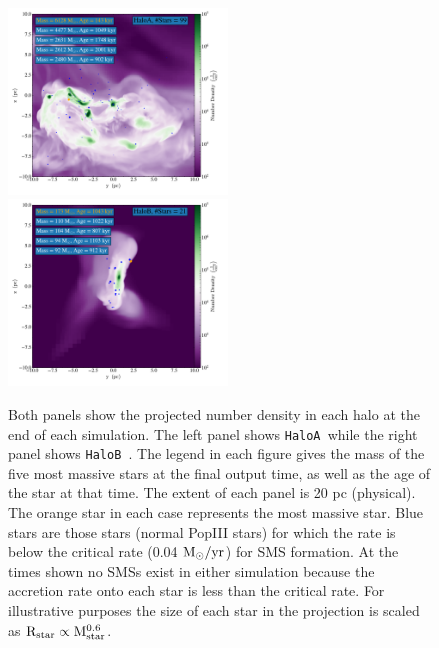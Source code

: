 \documentclass[graphics, twocolumn, usenatbib]{mn2e}
\newcommand{\msolaryrc} {$\rm{M_{\odot}/yr}$}
\newcommand{\ha} {\texttt{HaloA~}}
\newcommand{\hb} {\texttt{HaloB~}}
\begin{document}
\begin{figure}
\centering
\begin{minipage}{175mm}      \begin{center} 
\centerline{
\includegraphics[width=0.52\textwidth]{FIGURES/HaloA/Proj_z_number_density_2001.pdf}
\includegraphics[width=0.52\textwidth]{FIGURES/HaloB/Proj_z_number_density_1103.pdf}}
\caption{Both panels show the projected number density in each halo at the end of each simulation. The
  left panel shows \ha while the right panel shows \hb.
  The legend in each figure gives the mass of the five most massive stars at the final output time, as well as
  the age of the star at that time. The extent of each panel is 20 pc (physical). The orange
  star in each case represents the most massive star. Blue stars are those stars (normal PopIII stars) for
  which the rate is below the critical rate (0.04 \msolaryrc) for SMS formation. At the times shown no
  SMSs exist in either simulation because the accretion rate onto each star is less than the
  critical rate.  For illustrative purposes the size of each star in the
  projection is scaled as $\rm{R_{star}} \propto \rm{M_{star}^{0.6}}$.}  \label{Fig:ProjectionEnd}
\end{center} \end{minipage}

\end{figure}
\end{document}
